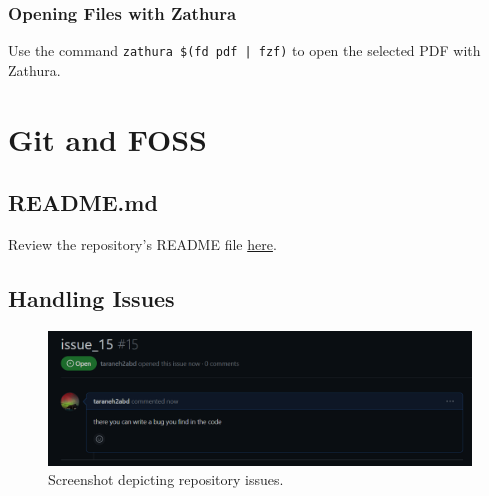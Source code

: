 \documentclass[12pt]{article}
\begin{document}
\subsubsection{Opening Files with Zathura}
    Use the command \texttt{zathura \$(fd pdf | fzf)} to open the selected PDF with Zathura.

\section{Git and FOSS}
\subsection{README.md}
Review the repository's README file \href{https://github.com/taraneh2abd/LATEX_auto_pdf/blob/main/README.md}{here}.

\subsection{Handling Issues}
\begin{figure}[!h]
    \centering
    \includegraphics[width=1\textwidth]{issues.png}
    \caption{Screenshot depicting repository issues.}
\end{figure}
\end{document}
